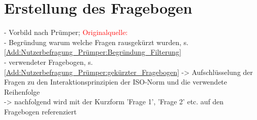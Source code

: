 \section{Erstellung des Fragebogen}
- Vorbild nach Prümper; \textcolor{red}{Originalquelle: \cite{http://www.uselab.tu-berlin.de/wiki/images/6/62/ISONorm_Kurzversion.pdf}}\\
- Begründung warum welche Fragen rausgekürzt wurden, s. \autoref{Add:Nutzerbefragung_Prümper:Begründung_Filterung}\\
- verwendeter Fragebogen, s. \autoref{Add:Nutzerbefragung_Prümper:gekürzter_Fragebogen}
-> Aufschlüsselung der Fragen zu den Interaktionsprinzipien der ISO-Norm und die verwendete Reihenfolge\\
-> nachfolgend wird mit der Kurzform 'Frage 1', 'Frage 2' etc. auf den Fragebogen referenziert
